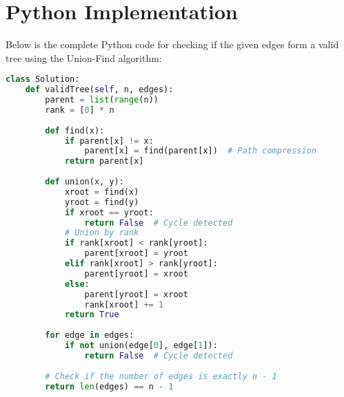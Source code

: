 \newpage %
\section*{Python Implementation}


Below is the complete Python code for checking if the given edges form a valid tree using the Union-Find algorithm:

\begin{fullwidth}
\begin{lstlisting}[language=Python]
class Solution:
    def validTree(self, n, edges):
        parent = list(range(n))
        rank = [0] * n
        
        def find(x):
            if parent[x] != x:
                parent[x] = find(parent[x])  # Path compression
            return parent[x]
        
        def union(x, y):
            xroot = find(x)
            yroot = find(y)
            if xroot == yroot:
                return False  # Cycle detected
            # Union by rank
            if rank[xroot] < rank[yroot]:
                parent[xroot] = yroot
            elif rank[xroot] > rank[yroot]:
                parent[yroot] = xroot
            else:
                parent[yroot] = xroot
                rank[xroot] += 1
            return True
        
        for edge in edges:
            if not union(edge[0], edge[1]):
                return False  # Cycle detected
        
        # Check if the number of edges is exactly n - 1
        return len(edges) == n - 1
\end{lstlisting}
\end{fullwidth}

